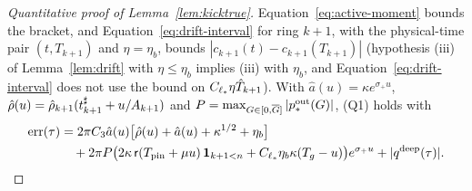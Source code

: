 \begin{proof}[Quantitative proof of Lemma~\ref{lem:kicktrue}]
Equation~\eqref{eq:active-moment} bounds the bracket, and
Equation~\eqref{eq:drift-interval} for ring $k+1$, with the physical-time pair $(t,T_{k+1})$ and
$\eta=\eta_b$, bounds $|c_{k+1}(t)-c_{k+1}(T_{k+1})|$
(hypothesis (iii) of Lemma~\ref{lem:drift} with
$\eta\le\eta_b$ implies (iii) with $\eta_b$, and
Equation~\eqref{eq:drift-interval} does not use the bound on
$C_{\ell_*}\eta\hat T_{k+1}$). With $\hat a(u)=\kappa e^{\sigma_+u}$,
$\hat\rho(u)=\hat\rho_{k+1}(t^\sharp_{k+1}+u/A_{k+1})$ and $P=\max_{G\in[0,\overline{G}]}|p^{\mathrm{out}}_*(G)|$, (Q1) holds with
\begin{equation}
\label{eq:kicktrue-error}
\begin{aligned}
\mathrm{err}(\tau)&=2\pi C_3\hat a(u)\big[\hat\rho(u)+\hat a(u)+\kappa^{1/2}+\eta_b\big]\\
&\quad+2\pi P\big(2\kappa\,\mathsf{r}(T_{\mathrm{pin}}+\mu u)\,\mathbf 1_{k+1<n}+C_{\ell_*}\eta_b\kappa(T_g-u)\big)e^{\sigma_+u}
+|q^{\mathrm{deep}}(\tau)| .
\end{aligned}
\end{equation}


\end{proof}
